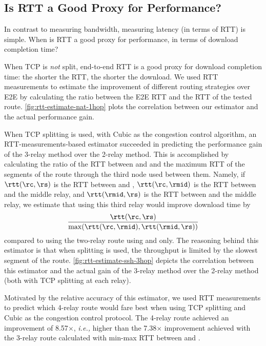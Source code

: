 \documentclass{hotnets17}
\providecommand{\ie}{\emph{i.e.,} }
\begin{document}
\subsection{Is RTT a Good Proxy for Performance?}

In contrast to measuring bandwidth, measuring latency (in terms of RTT) is simple. When is RTT a good proxy for performance, in terms of download completion time?

 When TCP is \emph{not} split, end-to-end RTT is a good proxy for download completion time: the shorter the RTT, the shorter the download. We used RTT measurements to estimate the improvement of different routing strategies over E2E by calculating the ratio between the E2E RTT and the RTT of the tested route. \autoref{fig:rtt-estimate-nat-1hop} plots the correlation between our estimator and the actual performance gain. %

 When TCP splitting is used, with Cubic as the congestion control algorithm, an RTT-measurements-based estimator succeeded in predicting the performance gain of the 3-relay method over the 2-relay method. This is accomplished by calculating the ratio of the RTT between \rc and \rs and the maximum RTT of the segments of the route through the third node used between them. Namely, if $\rtt(\rc,\rs)$ is the RTT between \rc and \rs, $\rtt(\rc,\rmid)$ is the RTT between \rc and the middle relay, and $\rtt(\rmid,\rs)$ is the RTT between \rs and the middle relay, we estimate that using this third relay would improve download time by 
\[
\frac{\rtt(\rc,\rs)}{\max(\rtt(\rc,\rmid),\rtt(\rmid,\rs))}
\]
compared to using the two-relay route using \rc and \rs only.
The reasoning behind this estimator is that when splitting is used, the throughput is limited by the slowest segment of the route. \autoref{fig:rtt-estimate-ssh-3hop} depicts the correlation between this estimator and the actual gain of the 3-relay method over the 2-relay method (both with TCP splitting at each relay).

Motivated by the relative accuracy of this estimator, we used RTT measurements to predict which 4-relay route would fare best when using TCP splitting and Cubic as the congestion control protocol. The 4-relay route achieved an improvement of 8.57$\times$, \ie higher than the 7.38$\times$ improvement achieved with the 3-relay route calculated with min-max RTT between \rc and \rs. 
 
\end{document}
